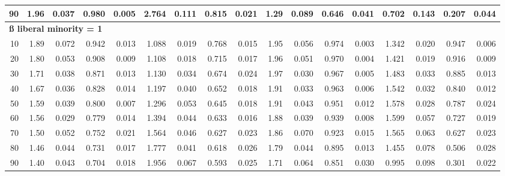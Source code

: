 \documentclass[
]{article}
\begin{document}
\begin{table}[H]
{\begin{tabular}{r|r|r|r|r|r|r|r|r|r|r|r|r|r|r|r|r}
\hline
\hspace{1em}90 & 1.96 & 0.037 & 0.980 & 0.005 & 2.764 & 0.111 & 0.815 & 0.021 & 1.29 & 0.089 & 0.646 & 0.041 & 0.702 & 0.143 & 0.207 & 0.044\\
\hline
\multicolumn{17}{l}{\textbf{ß liberal minority = 1}}\\
\hline
\hspace{1em}10 & 1.89 & 0.072 & 0.942 & 0.013 & 1.088 & 0.019 & 0.768 & 0.015 & 1.95 & 0.056 & 0.974 & 0.003 & 1.342 & 0.020 & 0.947 & 0.006\\
\hline
\hspace{1em}20 & 1.80 & 0.053 & 0.908 & 0.009 & 1.108 & 0.018 & 0.715 & 0.017 & 1.96 & 0.051 & 0.970 & 0.004 & 1.421 & 0.019 & 0.916 & 0.009\\
\hline
\hspace{1em}30 & 1.71 & 0.038 & 0.871 & 0.013 & 1.130 & 0.034 & 0.674 & 0.024 & 1.97 & 0.030 & 0.967 & 0.005 & 1.483 & 0.033 & 0.885 & 0.013\\
\hline
\hspace{1em}40 & 1.67 & 0.036 & 0.828 & 0.014 & 1.197 & 0.040 & 0.652 & 0.018 & 1.91 & 0.033 & 0.963 & 0.006 & 1.542 & 0.032 & 0.840 & 0.012\\
\hline
\hspace{1em}50 & 1.59 & 0.039 & 0.800 & 0.007 & 1.296 & 0.053 & 0.645 & 0.018 & 1.91 & 0.043 & 0.951 & 0.012 & 1.578 & 0.028 & 0.787 & 0.024\\
\hline
\hspace{1em}60 & 1.56 & 0.029 & 0.779 & 0.014 & 1.394 & 0.044 & 0.633 & 0.016 & 1.88 & 0.039 & 0.939 & 0.008 & 1.599 & 0.057 & 0.727 & 0.019\\
\hline
\hspace{1em}70 & 1.50 & 0.052 & 0.752 & 0.021 & 1.564 & 0.046 & 0.627 & 0.023 & 1.86 & 0.070 & 0.923 & 0.015 & 1.565 & 0.063 & 0.627 & 0.023\\
\hline
\hspace{1em}80 & 1.46 & 0.044 & 0.731 & 0.017 & 1.777 & 0.041 & 0.618 & 0.026 & 1.79 & 0.044 & 0.895 & 0.013 & 1.455 & 0.078 & 0.506 & 0.028\\
\hline
\hspace{1em}90 & 1.40 & 0.043 & 0.704 & 0.018 & 1.956 & 0.067 & 0.593 & 0.025 & 1.71 & 0.064 & 0.851 & 0.030 & 0.995 & 0.098 & 0.301 & 0.022\\
\hline
\end{tabular}}\begin{table}
\centering
{}
\end{table}
\end{table}
\end{document}

